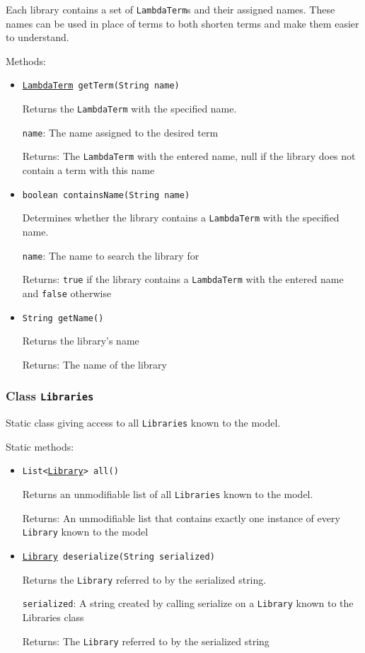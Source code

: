  Each library contains a set of \texttt{LambdaTerm}s and their
 assigned names. These names can be used in place of terms to both shorten
 terms and make them easier to understand.

Methods:
\begin{itemize}
\item \texttt{\hyperref[type:edu.kit.wavelength.client.model.term.LambdaTerm]{LambdaTerm} getTerm(String name)}

Returns the \texttt{LambdaTerm} with the specified name.

\texttt{name}: The name assigned to the desired term

Returns: The \texttt{LambdaTerm} with the entered name, null if the library
         does not contain a term with this name

\item \texttt{boolean containsName(String name)}

Determines whether the library contains a \texttt{LambdaTerm} with the
 specified name.

\texttt{name}: The name to search the library for

Returns: \texttt{true} if the library contains a \texttt{LambdaTerm} with the
         entered name and \texttt{false} otherwise

\item \texttt{String getName()}

Returns the library's name

Returns: The name of the library

\end{itemize}

\subsubsection{Class \texttt{Libraries}}
\label{type:edu.kit.wavelength.client.model.library.Libraries}
Static class giving access to all \texttt{Libraries} known to the model.

Static methods:
\begin{itemize}
\item \texttt{List<\hyperref[type:edu.kit.wavelength.client.model.library.Library]{Library}> all()}

Returns an unmodifiable list of all \texttt{Libraries} known to the model.

Returns: An unmodifiable list that contains exactly one instance of every
         \texttt{Library} known to the model

\item \texttt{\hyperref[type:edu.kit.wavelength.client.model.library.Library]{Library} deserialize(String serialized)}

Returns the \texttt{Library} referred to by the serialized string.

\texttt{serialized}: A string created by calling serialize on a \texttt{Library} known
            to the Libraries class

Returns: The \texttt{Library} referred to by the serialized string

\end{itemize}

